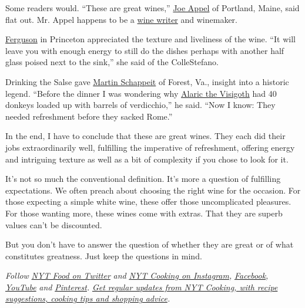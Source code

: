 Some readers would. ``These are great wines,''
\href{https://www.nytimes.com/2020/07/02/dining/drinks/wine-school-assignment-verdicchio-di-matelica.html\#commentsContainer\&permid=108034206}{Joe
Appel} of Portland, Maine, said flat out. Mr. Appel happens to be a
\href{https://twitter.com/joeyappel?lang=en}{wine writer} and winemaker.

\href{https://www.nytimes.com/2020/07/02/dining/drinks/wine-school-assignment-verdicchio-di-matelica.html\#commentsContainer\&permid=108072656}{Ferguson}
in Princeton appreciated the texture and liveliness of the wine. ``It
will leave you with enough energy to still do the dishes perhaps with
another half glass poised next to the sink,'' she said of the
ColleStefano.

Drinking the Salse gave
\href{https://www.nytimes.com/2020/07/02/dining/drinks/wine-school-assignment-verdicchio-di-matelica.html\#commentsContainer\&permid=108094105}{Martin
Schappeit} of Forest, Va., insight into a historic legend. ``Before the
dinner I was wondering why
\href{https://www.empson.com/territory/marche/verdicchio/}{Alaric the
Visigoth} had 40 donkeys loaded up with barrels of verdicchio,'' he
said. ``Now I know: They needed refreshment before they sacked Rome.''

In the end, I have to conclude that these are great wines. They each did
their jobs extraordinarily well, fulfilling the imperative of
refreshment, offering energy and intriguing texture as well as a bit of
complexity if you chose to look for it.

It's not so much the conventional definition. It's more a question of
fulfilling expectations. We often preach about choosing the right wine
for the occasion. For those expecting a simple white wine, these offer
those uncomplicated pleasures. For those wanting more, these wines come
with extras. That they are superb values can't be discounted.

But you don't have to answer the question of whether they are great or
of what constitutes greatness. Just keep the questions in mind.

\emph{Follow} \emph{\href{https://twitter.com/nytfood}{NYT Food on
Twitter}} \emph{and}
\emph{\href{https://www.instagram.com/nytcooking/}{NYT Cooking on
Instagram},}
\emph{\href{https://www.facebook.com/nytcooking/}{Facebook},}
\emph{\href{https://www.youtube.com/nytcooking}{YouTube}} \emph{and}
\emph{\href{https://www.pinterest.com/nytcooking/}{Pinterest}.}
\emph{\href{https://www.nytimes.com/newsletters/cooking}{Get regular
updates from NYT Cooking, with recipe suggestions, cooking tips and
shopping advice}.}

